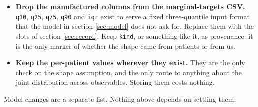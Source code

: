\documentclass[11pt]{article}
\begin{document}
\begin{itemize}[label={},leftmargin=1.6em]
\item[$\square$] \textbf{Drop the manufactured columns from the marginal-targets
CSV.} \texttt{q10}, \texttt{q25}, \texttt{q75}, \texttt{q90} and \texttt{iqr}
exist to serve a fixed three-quantile input format that the model in section
\ref{sec:model} does not ask for. Replace them with the slots of section
\ref{sec:record}. Keep \texttt{kind}, or something like it, as provenance: it is
the only marker of whether the shape came from patients or from us.

\item[$\square$] \textbf{Keep the per-patient values wherever they exist.} They
are the only check on the shape assumption, and the only route to anything about
the joint distribution across observables. Storing them costs nothing.

\end{itemize}

Model changes are a separate list. Nothing above depends on settling them.
\end{document}
